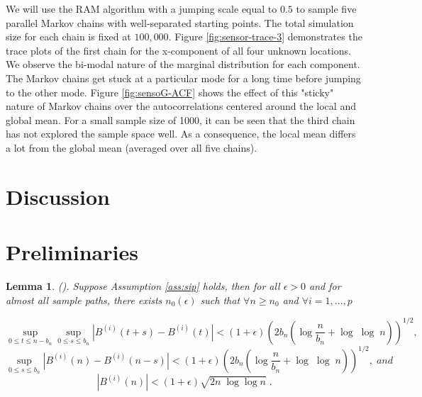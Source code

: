 \documentclass[11pt]{article}
\newtheorem{lemma}{Lemma}
\theoremstyle{remark}
\begin{document}


We will use the RAM algorithm with a jumping scale equal to $0.5$ to sample five parallel Markov chains with well-separated starting points. The total simulation size for each chain is fixed at $100,000$. Figure \ref{fig:sensor-trace-3} demonstrates the trace plots of the first chain for the x-component of all four unknown locations. We observe the bi-modal nature of the marginal distribution for each component. The Markov chains get stuck at a particular mode for a long time before jumping to the other mode. Figure \ref{fig:sensoG-ACF} shows the effect of this "sticky" nature of Markov chains over the autocorrelations centered around the local and global mean. For a small sample size of 1000, it can be seen that the third chain has not explored the sample space well. As a consequence, the local mean differs a lot from the global mean (averaged over all five chains).

 
\section{Discussion} \label{sec:discussion}
 

\appendix

\section{Preliminaries} \label{apdx:preliminaries}

\begin{lemma}
\label{lemma: brownian}
(\cite{csorgo2014strong}). Suppose Assumption \ref{ass:sip} holds, then for all $\epsilon > 0$ and for almost all sample paths, there exists $n_{0}\left(\epsilon\right)$ such that $\forall n\geq n_{0}$ and $\forall i = 1, ..., p$

\[
\sup_{0\leq t \leq n-b_n}\sup_{0 \leq s \leq b_n} \left| B^{\left(i\right)}\left(t+s\right) - B^{\left(i\right)}\left(t\right) \right| < \left(1+ \epsilon\right)\left(2b_n\left(\log\dfrac{n}{b_n} + \log\; \log\; n\right)\right)^{1/2} ,
\]
%
\[
\sup_{0 \leq s \leq b_n} \left|B^{\left(i\right)}\left(n\right) - B^{\left(i\right)}\left(n - s\right)\right| < \left(1+ \epsilon\right)\left(2b_n\left(\log\dfrac{n}{b_n} + \log\;\log\;n\right)\right)^{1/2} , \;and
\]
%
\[
\left|B^{\left(i\right)}\left(n\right)\right| < \left(1+\epsilon\right)\sqrt{2n\;\log \log n} \; . 
\]
\end{lemma}
\end{document}
